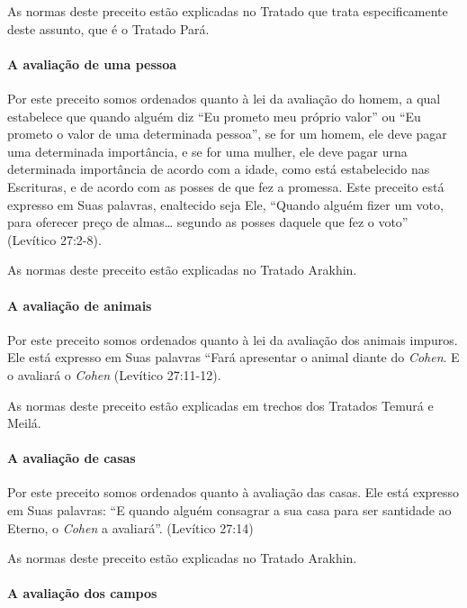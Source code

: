 As normas deste preceito estão explicadas no Tratado que trata
especificamente deste assunto, que é o Tratado Pará.



\paragraph{A avaliação de uma pessoa}

Por este preceito somos ordenados quanto à lei da avaliação do homem, a
qual estabelece que quando alguém diz ``Eu prometo meu próprio valor''
ou ``Eu prometo o valor de uma determinada pessoa'', se for um homem,
ele deve pagar uma determinada importância, e se for uma mulher, ele
deve pagar urna determinada importância de acordo com a idade, como está
estabelecido nas Escrituras, e de acordo com as posses de que fez a
promessa. Este preceito está expresso em Suas palavras, enaltecido seja
Ele, ``Quando alguém fizer um voto, para oferecer preço de almas\ldots{}
segundo as posses daquele que fez o voto'' (Levítico 27:2-8).

As normas deste preceito estão explicadas no Tratado Arakhin.


\paragraph{A avaliação de animais}

Por este preceito somos ordenados quanto à lei da avaliação dos animais
impuros. Ele está expresso em Suas palavras ``Fará apresentar o animal
diante do \textit{Cohen}. E o avaliará o \textit{Cohen} (Levítico 27:11-12).

As normas deste preceito estão explicadas em trechos dos Tratados Temurá
e Meilá.

\paragraph{A avaliação de casas}

Por este preceito somos ordenados quanto à avaliação das casas. Ele está
expresso em Suas palavras: ``E quando alguém consagrar a sua casa para
ser santidade ao Eterno, o \textit{Cohen} a avaliará''. (Levítico 27:14)

As normas deste preceito estão explicadas no Tratado Arakhin.

\paragraph{A avaliação dos campos}

